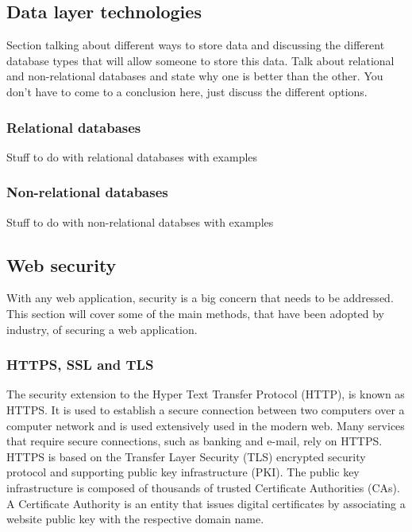 \subsection{Data layer technologies}
Section talking about different ways to store data and discussing the different database types
that will allow someone to store this data. Talk about relational and non-relational databases and
state why one is better than the other. You don't have to come to a conclusion here, just discuss
the different options.
\subsubsection{Relational databases}
Stuff to do with relational databases with examples

\subsubsection{Non-relational databases}

Stuff to do with non-relational databses with examples

\subsection{Web security}
With any web application, security is a big concern that needs to be addressed.
This section will cover some of the main methods, that have been adopted by industry, of securing a web application.

\subsubsection{HTTPS, SSL and TLS}
The security extension to the Hyper Text Transfer Protocol (HTTP), is known as HTTPS.
It is used to establish a secure connection between two computers over a computer network and is used extensively used in the modern web.
Many services that require secure connections, such as banking and e-mail, rely on HTTPS.
HTTPS is based on the Transfer Layer Security (TLS) encrypted security protocol and supporting public key infrastructure (PKI).
The public key infrastructure is composed of thousands of trusted Certificate Authorities (CAs).
A Certificate Authority is an entity that issues digital certificates by associating a website public key with the respective domain name.

